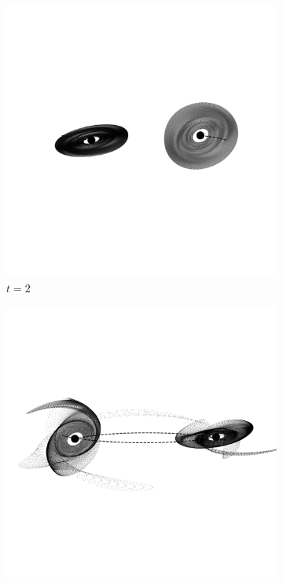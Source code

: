 \documentclass[11pt,twocolumn]{article}
\begin{document}
        \begin{figure}[!tbp]
        \captionsetup[subfigure]{labelformat=empty}
        	
            \begin{subfigure}[b]{0.45\textwidth}
    			\includegraphics[width=\textwidth, trim={1cm 6cm 1cm 6cm}, clip]{ngc5426/Ngc2_000000_115.pdf}
    			\caption{$t = 2$}
  			\end{subfigure}
            \hfill%
            \begin{subfigure}[b]{0.45\textwidth}
    			\includegraphics[width=\textwidth, trim={1cm 6cm 1cm 6cm}, clip]{ngc5426/Ngc7_000000_115.pdf}

\end{subfigure}
\end{figure}
\end{document}
